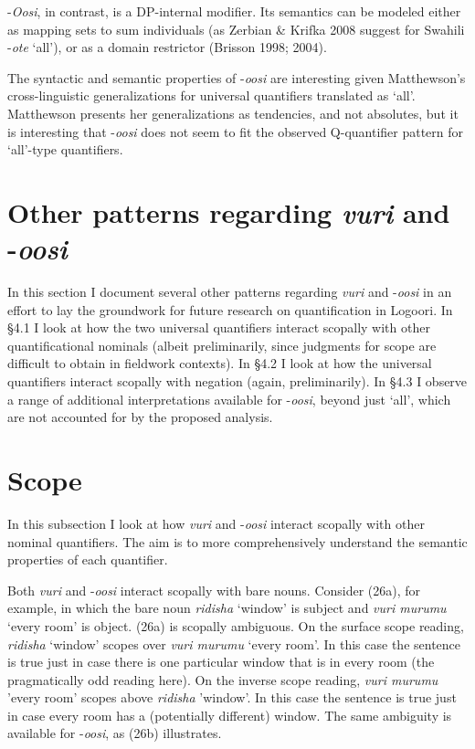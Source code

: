 \documentclass[output=paper]{langsci/langscibook}
\begin{document}
  {}-\textit{Oosi}, in contrast, is a DP-internal modifier. Its semantics can be modeled either as mapping sets to sum individuals (as Zerbian \& Krifka 2008 suggest for Swahili -\textit{ote} ‘all’), or as a domain restrictor (Brisson 1998; 2004). 

  The syntactic and semantic properties of -\textit{oosi} are interesting given Matthewson's cross-linguistic generalizations for universal quantifiers translated as ‘all’. Matthewson presents her generalizations as tendencies, and not absolutes, but it is interesting that -\textit{oosi} does not seem to fit the observed Q-quantifier pattern for ‘all’-type quantifiers. 

\section{Other patterns regarding \textit{vuri} and -\textit{oosi}}

  In this section I document several other patterns regarding \textit{vuri} and -\textit{oosi} in an effort to lay the groundwork for future research on quantification in Logoori. In §4.1 I look at how the two universal quantifiers interact scopally with other quantificational nominals (albeit preliminarily, since judgments for scope are difficult to obtain in fieldwork contexts). In §4.2 I look at how the universal quantifiers interact scopally with negation (again, preliminarily). In §4.3 I observe a range of additional interpretations available for -\textit{oosi}, beyond just ‘all’, which are not accounted for by the proposed analysis.

\section{Scope} 

  In this subsection I look at how \textit{vuri} and -\textit{oosi} interact scopally with other nominal quantifiers. The aim is to more comprehensively understand the semantic properties of each quantifier.

  Both \textit{vuri} and -\textit{oosi} interact scopally with bare nouns. Consider (26a), for example, in which the bare noun \textit{ridisha} ‘window’ is subject and \textit{vuri murumu} ‘every room’ is object. (26a) is scopally ambiguous. On the surface scope reading, \textit{ridisha} ‘window’ scopes over \textit{vuri murumu} ‘every room’. In this case the sentence is true just in case there is one particular window that is in every room (the pragmatically odd reading here). On the inverse scope reading, \textit{vuri murumu} 'every room' scopes above \textit{ridisha} 'window'. In this case the sentence is true just in case every room has a (potentially different) window. The same ambiguity is available for -\textit{oosi}, as (26b) illustrates.
\end{document}
